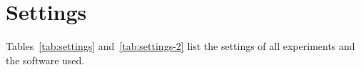 \section{Settings}\label{app:settings}

Tables~\ref{tab:settings} and~\ref{tab:settings-2} list the settings of
all experiments and the software used.

\begin{table}[!ht]
\caption{Settings of the model, of the federation and of a FedAvg SFT
round}\label{tab:settings}
\footnotesize

\end{table}

\begin{table}[!ht]
\caption{Settings of a preference round and of evaluation, with the
software and hardware of the experiments. Software is listed with its
version and maker}\label{tab:settings-2}
\footnotesize

\end{table}
